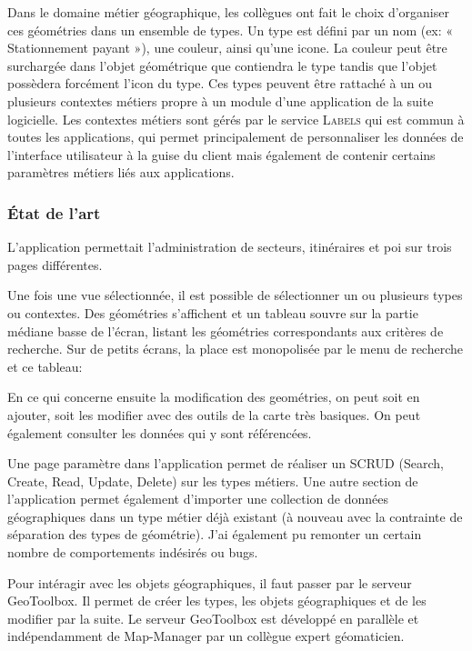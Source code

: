 \documentclass{rapportUHA40}
\begin{document}
Dans le domaine métier géographique, les collègues ont fait le choix
d'organiser ces géométries dans un ensemble de types. Un type est défini par un
nom (ex: « Stationnement payant »), une couleur, ainsi qu'une icone. La couleur
peut être surchargée dans l'objet géométrique que contiendra le type tandis que
l'objet possèdera forcément l'icon du type. Ces types peuvent être rattaché à
un ou plusieurs contextes métiers propre à un module d'une application de la
suite logicielle. Les contextes métiers sont gérés par le service
\textsc{Labels} qui est commun à toutes les applications, qui permet
principalement de personnaliser les données de l'interface utilisateur à la
guise du client mais également de contenir certains paramètres métiers liés aux
applications.

\subsubsection{État de l'art}
L’application permettait l’administration de secteurs, itinéraires et poi sur
trois pages différentes. 

Une fois une vue sélectionnée, il est possible de sélectionner un ou plusieurs
types ou contextes. Des géométries s'affichent et un tableau souvre sur la
partie médiane basse de l'écran, listant les géométries correspondants aux
critères de recherche. Sur de petits écrans, la place est monopolisée par le
menu de recherche et ce tableau:

En ce qui concerne ensuite la modification des geométries, on peut soit en
ajouter, soit les modifier avec des outils de la carte très basiques. On peut
également consulter les données qui y sont référencées.

Une page paramètre dans l'application permet de réaliser un SCRUD (Search,
Create, Read, Update, Delete) sur les types métiers. Une autre section de
l'application permet également d'importer une collection de données
géographiques dans un type métier déjà existant (à nouveau avec la contrainte
de séparation des types de géométrie). J'ai également pu remonter un certain
nombre de comportements indésirés ou bugs.

Pour intéragir avec les objets géographiques, il faut passer par le serveur
GeoToolbox. Il permet de créer les types, les objets géographiques et de les
modifier par la suite. Le serveur GeoToolbox est développé en parallèle et
indépendamment de Map-Manager par un collègue expert géomaticien.
\end{document}
